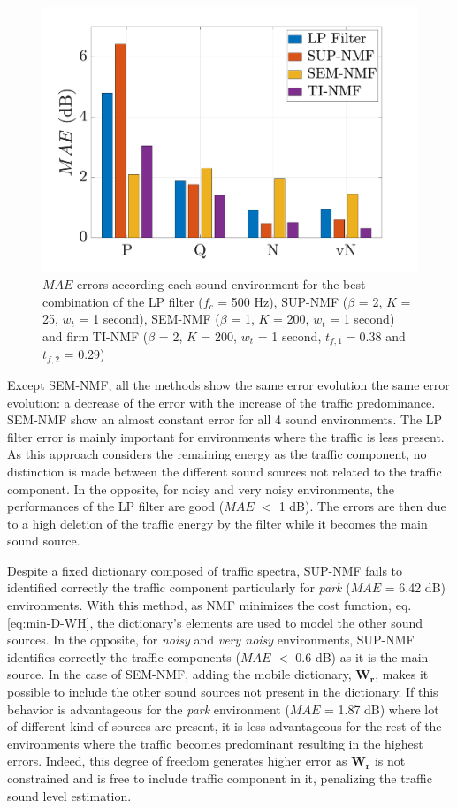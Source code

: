 \documentclass[review,5p,twocolumn,sort&compress,times]{elsarticle}
\begin{document}
\begin{figure}[t]
\centering
\includegraphics[width=\linewidth]{figures/mea_grafic_bar.pdf}
\caption{$MAE$ errors according each sound environment for the best combination of the LP filter ($f_c$ = 500 Hz), SUP-NMF ($\beta$ = 2, $K$ = 25, $w_t$ = 1 second), SEM-NMF ($\beta$ = 1, $K$ = 200, $w_t$ = 1 second) and firm TI-NMF ($\beta$ = 2, $K$ = 200, $w_t$ = 1 second, $t_{f,1} = 0.38$ and $t_{f,2}$ = 0.29)}
\label{fig:mae_env}
\end{figure}

Except SEM-NMF, all the methods show the same error evolution the same error evolution: a decrease of the error with the increase of the traffic predominance. SEM-NMF show an almost constant error for all 4 sound environments. The LP filter error is mainly important for environments where the traffic is less present. As this approach considers the remaining energy as the traffic component, no distinction is made between the different sound sources not related to the traffic component. In the opposite, for noisy and very noisy environments, the performances of the LP filter are good ($MAE$ $<$ 1 dB). The errors are then due to a high deletion of the traffic energy by the filter while it becomes the main sound source. 

Despite a fixed dictionary composed of traffic spectra, SUP-NMF fails to identified correctly the traffic component particularly for \textit{park} ($MAE$ = 6.42 dB) environments. With this method, as NMF minimizes the cost function, eq. \ref{eq:min-D-WH}, the dictionary's elements are used to model the other sound sources. In the opposite, for \textit{noisy} and \textit{very noisy} environments, SUP-NMF identifies correctly the traffic components ($MAE$ $<$ 0.6 dB) as it is the main source. 
In the case of SEM-NMF, adding the mobile dictionary, $\mathbf{W_r}$, makes it possible to include the other sound sources not present in the dictionary. If this behavior is advantageous for the \textit{park} environment ($MAE$ = 1.87 dB) where lot of different kind of sources are present, it is less advantageous for the rest of the environments where the traffic becomes predominant resulting in the highest errors. Indeed, this degree of freedom generates higher error as $\mathbf{W_r}$ is not constrained and is free to include traffic component in it, penalizing the traffic sound level estimation.
\end{document}
